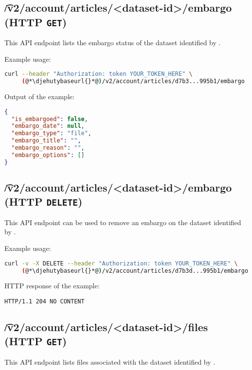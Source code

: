 
\subsection{\t{/v2/account/articles/<dataset-id>/embargo} (HTTP \texttt{GET})}

  This API endpoint lists the embargo status of the dataset identified by .

  Example usage:
\begin{lstlisting}[language=bash]
curl --header "Authorization: token YOUR_TOKEN_HERE" \
     (@*\djehutybaseurl{}*@)/v2/account/articles/d7b3...995b1/embargo | jq
\end{lstlisting}

  Output of the example:
\begin{lstlisting}[language=JSON]
{
  "is_embargoed": false,
  "embargo_date": null,
  "embargo_type": "file",
  "embargo_title": "",
  "embargo_reason": "",
  "embargo_options": []
}
\end{lstlisting}

\subsection{\t{/v2/account/articles/<dataset-id>/embargo} (HTTP \texttt{DELETE})}

  This API endpoint can be used to remove an embargo on the dataset
  identified by \code{dataset-id}.

  Example usage:
\begin{lstlisting}[language=bash]
curl -v -X DELETE --header "Authorization: token YOUR_TOKEN_HERE" \
     (@*\djehutybaseurl{}*@)/v2/account/articles/d7b3d...995b1/embargo
\end{lstlisting}

  HTTP response of the example:
\begin{lstlisting}
HTTP/1.1 204 NO CONTENT
\end{lstlisting}

\subsection{\t{/v2/account/articles/<dataset-id>/files} (HTTP \texttt{GET})}

  This API endpoint lists files associated with the dataset identified by
  .

